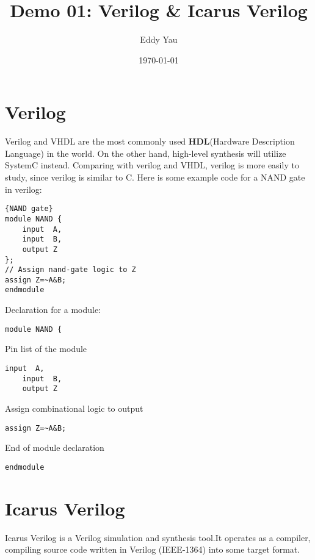 \documentclass[12pt,a4paper]{article}
\title{Demo 01: Verilog \& Icarus Verilog\vspace{-1ex}}
\author{Eddy Yau\vspace{-2ex}}
\date{\today}
\begin{document}
\maketitle 
\section{Verilog}
Verilog and VHDL are the most commonly used \textbf{HDL}(Hardware Description Language) in the world. 
On the other hand, high-level synthesis will utilize SystemC instead. 
Comparing with verilog and VHDL, verilog is more easily to study, since verilog is similar to C.
\newline
Here is some example code for a NAND gate in verilog:

\lstset{tabsize=2,breaklines=true,numbers=left,basicstyle=footnotesize,xleftmargin=30pt}


\begin{lstlisting}[style={verilog-style},frame=single,caption=NAND.v]{NAND gate}
module NAND {
	input  A,
	input  B,
	output Z
};
// Assign nand-gate logic to Z
assign Z=~A&B;
endmodule
\end{lstlisting}

\smallskip
Declaration for a module:
\begin{lstlisting}[style={verilog-style},frame=single,firstnumber=1]
module NAND {
\end{lstlisting}

\smallskip
Pin list of the module
\begin{lstlisting}[style={verilog-style},frame=single,firstnumber=2]
	input  A,
	input  B,
	output Z
\end{lstlisting}

\smallskip
Assign combinational logic to output
\begin{lstlisting}[style={verilog-style},frame=single,firstnumber=7]
assign Z=~A&B;
\end{lstlisting}

\smallskip
End of module declaration
\begin{lstlisting}[style={verilog-style},frame=single,firstnumber=8]
endmodule
\end{lstlisting}
\section{Icarus Verilog}
Icarus Verilog is a Verilog simulation and synthesis tool.It operates as a compiler, compiling source code written in Verilog (IEEE-1364) into some target format.\cite{iverilogwebsite} 

\printbibliography
\end{document}
